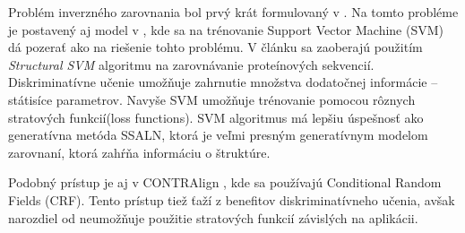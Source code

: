 Problém inverzného zarovnania bol prvý krát formulovaný v \cite{inverseAlign1}. 
Na tomto probléme je postavený aj model v \cite{svmTrainingProteinsAlignment}, kde sa na trénovanie Support Vector Machine (SVM) dá pozerať ako na riešenie tohto problému. V článku sa zaoberajú použitím \textit{Structural SVM} algoritmu na zarovnávanie proteínových sekvencií. Diskriminatívne učenie umožňuje zahrnutie množstva dodatočnej informácie -- státisíce parametrov.
Navyše SVM umožňuje trénovanie pomocou rôznych stratových funkcií(loss functions).
SVM algoritmus má lepšiu úspešnosť ako generatívna metóda SSALN, ktorá je veľmi presným generatívnym modelom zarovnaní, ktorá zahŕňa informáciu o štruktúre. 

Podobný prístup je aj v CONTRAlign \cite{contralign}, kde sa používajú Conditional Random Fields (CRF). Tento prístup tiež ťaží z benefitov diskriminatívneho učenia, avšak narozdiel od \cite{svmTrainingProteinsAlignment} neumožňuje použitie stratových funkcií závislých na aplikácii.
